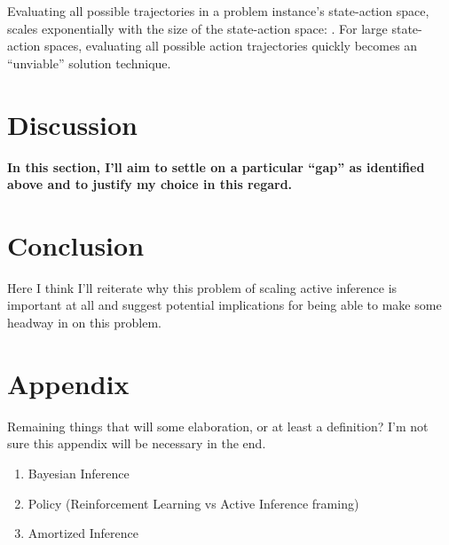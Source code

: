 \documentclass[onecolumn]{IEEEtran}
\begin{document}
Evaluating all possible trajectories in a problem instance's state-action space, scales exponentially with the size of the state-action space: \textcite{Applications-of-FEP-Machine-Learning-Neuroscience}. For large state-action spaces, evaluating all possible action trajectories quickly becomes an ``unviable'' solution technique.

\section{Discussion}
\textbf{In this section, I'll aim to settle on a particular ``gap'' as identified above and to justify my choice in this regard.}

\section{Conclusion}

Here I think I'll reiterate why this problem of scaling active inference is important at all and suggest potential implications for being able to make some headway in on this problem. 

\appendix
\section{Appendix}

Remaining things that will some elaboration, or at least a definition? I'm not sure this appendix will be necessary in the end.

\begin{enumerate}
	\item Bayesian Inference
	\item Policy (Reinforcement Learning vs Active Inference framing)
	\item Amortized Inference
\end{enumerate}


\printbibliography
\end{document}
